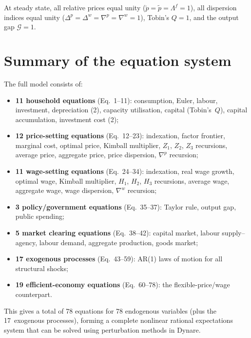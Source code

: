 \documentclass[11pt,a4paper]{article}
\begin{document}
At steady state, all relative prices equal unity ($\breve p = \tilde p =
\Lambda^f = 1$), all dispersion indices equal unity ($\Delta^p = \Delta^w
= \nabla^p = \nabla^w = 1$), Tobin's $Q = 1$, and the output gap
$\mathcal{G} = 1$.


\section{Summary of the equation system}
\label{sec:summary}

The full model consists of:
\begin{itemize}[nosep]
  \item \textbf{11 household equations} (Eq.~1--11): consumption, Euler,
    labour, investment, depreciation (2), capacity utilisation, capital
    (Tobin's~$Q$), capital accumulation, investment cost (2);
  \item \textbf{12 price-setting equations} (Eq.~12--23): indexation,
    factor frontier, marginal cost, optimal price, Kimball multiplier,
    $Z_1$, $Z_2$, $Z_3$ recursions, average price, aggregate price,
    price dispersion, $\nabla^p$ recursion;
  \item \textbf{11 wage-setting equations} (Eq.~24--34): indexation, real
    wage growth, optimal wage, Kimball multiplier, $H_1$, $H_2$, $H_3$
    recursions, average wage, aggregate wage, wage dispersion, $\nabla^w$
    recursion;
  \item \textbf{3 policy/government equations} (Eq.~35--37): Taylor rule,
    output gap, public spending;
  \item \textbf{5 market clearing equations} (Eq.~38--42): capital market,
    labour supply--agency, labour demand, aggregate production, goods
    market;
  \item \textbf{17 exogenous processes} (Eq.~43--59): AR(1) laws of
    motion for all structural shocks;
  \item \textbf{19 efficient-economy equations} (Eq.~60--78): the
    flexible-price/wage counterpart.
\end{itemize}

This gives a total of 78 equations for 78 endogenous variables (plus the
17~exogenous processes), forming a complete nonlinear rational expectations
system that can be solved using perturbation methods in Dynare.
\end{document}
